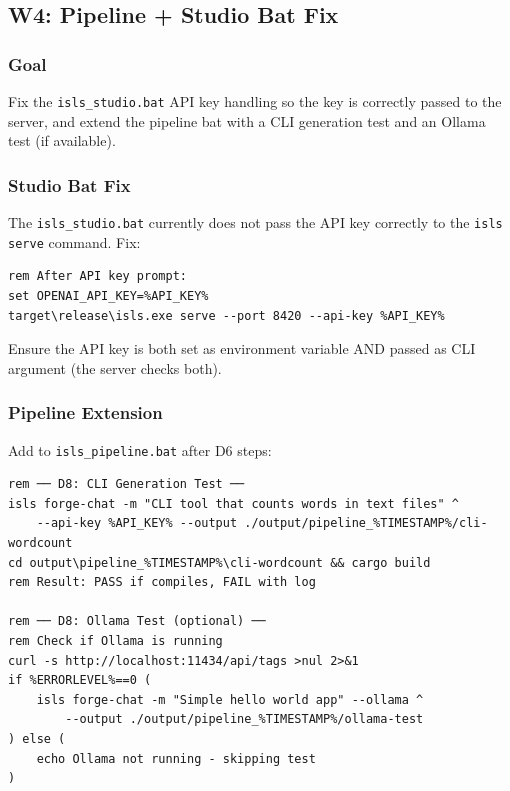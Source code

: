 \documentclass[11pt,a4paper]{article}
\begin{document}
\subsection{W4: Pipeline + Studio Bat Fix}
\label{sec:w4}

\subsubsection{Goal}

Fix the \texttt{isls\_studio.bat} API key handling so the key is 
correctly passed to the server, and extend the pipeline bat with 
a CLI generation test and an Ollama test (if available).

\subsubsection{Studio Bat Fix}

The \texttt{isls\_studio.bat} currently does not pass the API key 
correctly to the \texttt{isls serve} command. Fix:

\begin{lstlisting}[style=bash]
rem After API key prompt:
set OPENAI_API_KEY=%API_KEY%
target\release\isls.exe serve --port 8420 --api-key %API_KEY%
\end{lstlisting}

Ensure the API key is both set as environment variable AND passed 
as CLI argument (the server checks both).

\subsubsection{Pipeline Extension}

Add to \texttt{isls\_pipeline.bat} after D6 steps:

\begin{lstlisting}[style=bash]
rem ── D8: CLI Generation Test ──
isls forge-chat -m "CLI tool that counts words in text files" ^
    --api-key %API_KEY% --output ./output/pipeline_%TIMESTAMP%/cli-wordcount
cd output\pipeline_%TIMESTAMP%\cli-wordcount && cargo build
rem Result: PASS if compiles, FAIL with log

rem ── D8: Ollama Test (optional) ──
rem Check if Ollama is running
curl -s http://localhost:11434/api/tags >nul 2>&1
if %ERRORLEVEL%==0 (
    isls forge-chat -m "Simple hello world app" --ollama ^
        --output ./output/pipeline_%TIMESTAMP%/ollama-test
) else (
    echo Ollama not running - skipping test
)
\end{lstlisting}
\end{document}
